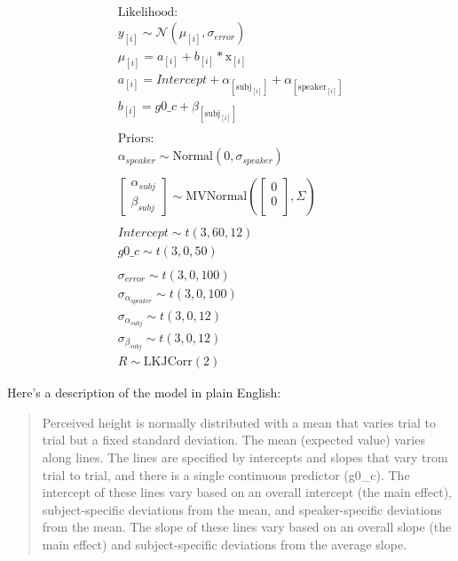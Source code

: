 \documentclass[
]{book}
\begin{document}
\begin{equation}
\begin{split}
\textrm{Likelihood:} \\
y_{[i]} \sim \mathcal{N}(\mu_{[i]},\sigma_{error}) \\
\mu_{[i]} = a_{[i]} + b_{[i]} * \mathrm{x}_{[i]}  \\ 
a_{[i]} = Intercept + \alpha_{[\mathrm{subj}_{[i]}]} + \alpha_{[\mathrm{speaker}_{[i]}]}  \\
b_{[i]} =  g0\_c + \beta_{[\mathrm{subj}_{[i]}]} \\ \\
\textrm{Priors:} \\
\alpha_{speaker} \sim \mathrm{Normal}(0,\sigma_{speaker}) \\ \\  
\begin{bmatrix} \alpha_{subj} \\ \beta_{subj} \end{bmatrix} \sim \mathrm{MVNormal} ( \begin{bmatrix} 0 \\ 0 \\ \end{bmatrix}, \Sigma) \\ \\
Intercept \sim t(3, 60, 12) \\
g0\_c \sim t(3, 0, 50) \\ \\
\sigma_{error} \sim t(3, 0, 100) \\
\sigma_{\alpha_{speaker}} \sim t(3, 0, 100) \\ 
\sigma_{\alpha_{subj}} \sim t(3, 0, 12) \\ 
\sigma_{\beta_{subj}} \sim t(3, 0, 12) \\ 
R \sim \mathrm{LKJCorr} (2)
\end{split}
\label{eq:68}
\end{equation}

Here's a description of the model in plain English:

\begin{quote}
Perceived height is normally distributed with a mean that varies trial to trial but a fixed standard deviation. The mean (expected value) varies along lines. The lines are specified by intercepts and slopes that vary trom trial to trial, and there is a single continuous predictor (g0\_c). The intercept of these lines vary based on an overall intercept (the main effect), subject-specific deviations from the mean, and speaker-specific deviations from the mean. The slope of these lines vary based on an overall slope (the main effect) and subject-specific deviations from the average slope.
\end{quote}
\end{document}
